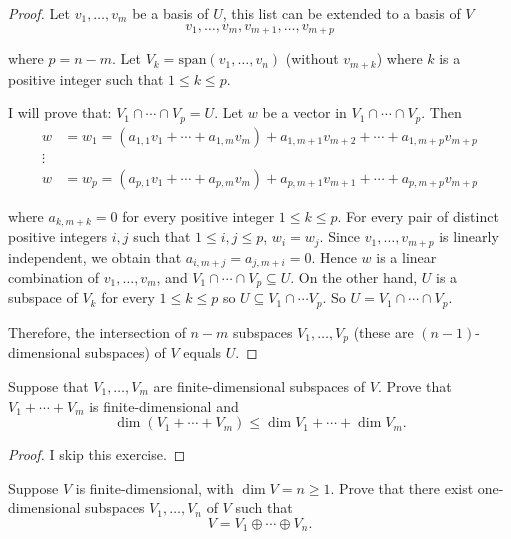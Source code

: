 \begin{proof}
    Let $v_{1}, \ldots, v_{m}$ be a basis of $U$, this list can be extended to a basis of $V$
    \[
        v_{1}, \ldots, v_{m}, v_{m+1}, \ldots, v_{m + p}
    \]

    where $p = n-m$. Let $V_{k} = \text{span}(v_{1}, \ldots, v_{n})$ (without $v_{m+k}$) where $k$ is a positive integer such that $1\leq k\leq p$.

    I will prove that: $V_{1}\cap \cdots\cap V_{p} = U$. Let $w$ be a vector in $V_{1}\cap \cdots\cap V_{p}$. Then
    \begin{align*}
        w & = w_{1} = (a_{1,1}v_{1} + \cdots + a_{1,m}v_{m}) + a_{1,m+1}v_{m+2} + \cdots + a_{1,m+p}v_{m+p} \\
        \vdots                                                                                              \\
        w & = w_{p} = (a_{p,1}v_{1} + \cdots + a_{p,m}v_{m}) + a_{p,m+1}v_{m+1} + \cdots + a_{p,m+p}v_{m+p}
    \end{align*}

    where $a_{k,m+k} = 0$ for every positive integer $1\leq k\leq p$. For every pair of distinct positive integers $i, j$ such that $1\leq i, j\leq p$, $w_{i} = w_{j}$. Since $v_{1}, \ldots, v_{m+p}$ is linearly independent, we obtain that $a_{i,m+j} = a_{j,m+i} = 0$. Hence $w$ is a linear combination of $v_{1}, \ldots, v_{m}$, and $V_{1}\cap \cdots\cap V_{p}\subseteq U$. On the other hand, $U$ is a subspace of $V_{k}$ for every $1\leq k\leq p$ so $U\subseteq V_{1}\cap \cdots V_{p}$. So $U = V_{1}\cap\cdots\cap V_{p}$.

    Therefore, the intersection of $n - m$ subspaces $V_{1}, \ldots, V_{p}$ (these are $(n-1)$-dimensional subspaces) of $V$ equals $U$.
\end{proof}

\begin{exercise}
    Suppose that $V_{1} , \ldots, V_{m}$ are finite-dimensional subspaces of $V$. Prove that $V_{1} + \cdots + V_{m}$ is finite-dimensional and
    \[
        \dim (V_{1} + \cdots + V_{m}) \leq \dim V_{1} + \cdots + \dim V_{m}.
    \]
\end{exercise}

\begin{proof}
    I skip this exercise.
\end{proof}

\begin{exercise}
    Suppose $V$ is finite-dimensional, with $\dim V = n \geq 1$. Prove that there exist one-dimensional subspaces $V_{1}, \ldots, V_{n}$ of $V$ such that
    \[
        V = V_{1} \oplus \cdots \oplus V_{n}.
    \]
\end{exercise}


